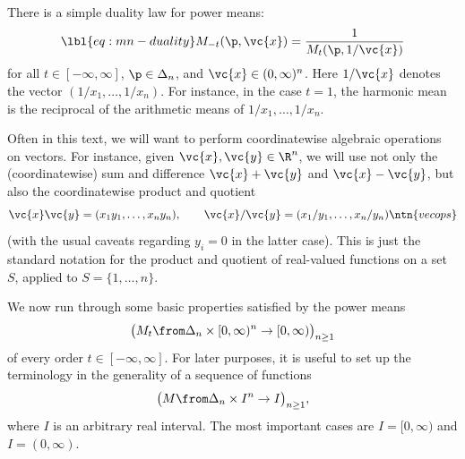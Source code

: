 There is a simple duality%
% 
%
% 
law for power means: 
% 
\begin{equation}
\lbl{eq:mn-duality}
M_{-t}(\p, \vc{x}) 
=
\frac{1}{M_t(\p, 1/\vc{x})}
\end{equation}
% 
for all $t \in [-\infty, \infty]$, $\p \in \Delta_n$, and $\vc{x} \in (0,
\infty)^n$.  Here $1/\vc{x}$ denotes the vector $(1/x_1, \ldots,
1/x_n)$.  For instance, in the case $t = 1$, the harmonic mean is the
reciprocal of the arithmetic means of $1/x_1, \ldots, 1/x_n$.

\begin{remark}
Often in this text, we will want to perform coordinatewise algebraic
operations on vectors.  For instance, given
$\vc{x}, \vc{y} \in \R^n$, we will use not only the (coordinatewise) sum
and difference $\vc{x} + \vc{y}$ and $\vc{x} - \vc{y}$, but also the
coordinatewise product and quotient
\[
\vc{x}\vc{y} = (x_1 y_1, \ldots, x_n y_n),
\qquad
\vc{x}/\vc{y} = (x_1/y_1, \ldots, x_n/y_n)
\ntn{vecops}
\]
(with the usual caveats regarding $y_i = 0$ in the latter case).  This is
just the standard notation for the product and quotient of real-valued
functions on a set $S$, applied to $S = \{1, \ldots, n\}$.
\end{remark}

We now run through some basic properties satisfied by the power means 
\[
\bigl( 
M_t \from \Delta_n \times [0, \infty)^n \to [0, \infty) 
\bigr)_{n \geq 1}
\]
of every order $t \in [-\infty, \infty]$.  For later purposes, it is useful
to set up the terminology in the generality of a sequence of functions
\[
\bigl( 
M \from \Delta_n \times I^n \to I
\bigr)_{n \geq 1},
\]
where $I$ is an arbitrary real interval.  The most important cases are $I =
[0, \infty)$ and $I = (0, \infty)$.

